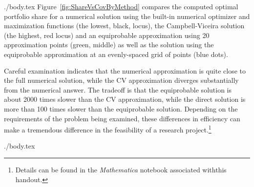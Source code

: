 \documentclass{handout}
\begin{document}
\begin{verbatimwrite}{./body.tex}
Figure~\ref{fig:ShareVsCovByMethod} compares the computed optimal portfolio share for a numerical solution 
using the built-in numerical optimizer and maximization functions (the lowest, black, locus), the Campbell-Viceira solution (the highest, red locus)
and an equiprobable approximation using 20 approximation points (green, middle) as well as the solution using the equiprobable approximation
at an evenly-spaced grid of points (blue dots).  

Careful examination indicates that the numerical approximation is quite close to the full numerical solution, while the CV approximation diverges substantially from the numerical answer.  The tradeoff is that the 
equiprobable solution is about 2000 times slower than the CV approximation, while the direct solution is more than 100 times slower
than the equiprobable solution.  Depending on the requirements of the problem being examined, these differences in 
efficiency can make a tremendous difference in the feasibility of a research project.\footnote{Details can be found in the {\it Mathematica} notebook associated withthis handout.}

\end{verbatimwrite}
 {./body.tex}


\end{document}
